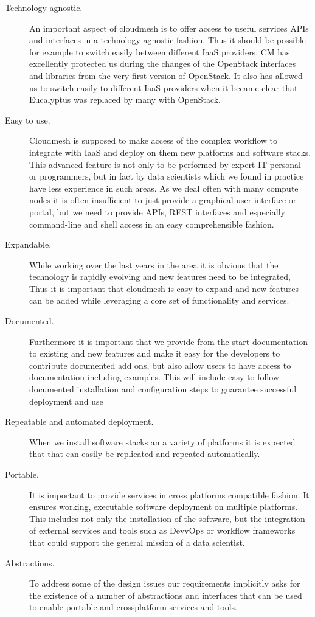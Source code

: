 \begin{description}
\item [Technology agnostic.] An important aspect of cloudmesh is to
  offer access to useful services APIs and interfaces in a technology
  agnostic fashion. Thus it should be possible for example to switch
  easily between different IaaS providers. CM has excellently protected
  us during the changes of the OpenStack interfaces and libraries from
  the very first version of OpenStack. It also has allowed us to
  switch easily to different IaaS providers when it became clear that
  Eucalyptus was replaced by many with OpenStack.

\item[Easy to use.] Cloudmesh is supposed to make access of the
  complex workflow to integrate with IaaS and deploy on them new
  platforms and software stacks. This advanced feature is not only to
  be performed by expert IT personal or programmers, but in fact by
  data scientists which we found in practice have less experience in
  such areas. As we deal often with many compute nodes it is often
  insufficient to just provide a graphical user interface or portal, but
  we need to provide APIs, REST interfaces and especially command-line
  and shell access in an easy comprehensible fashion. 

\item[Expandable.] While working over the last years in the area it is
  obvious that the technology is rapidly evolving and new features
  need to be integrated, Thus it is important that cloudmesh is easy
  to expand and new features can be added while leveraging a core set
  of functionality and services.

\item[Documented.] Furthermore it is important that we provide from
  the start documentation to existing and new features and make it
  easy for the developers to contribute documented add ons, but also
  allow users to have access to documentation including examples. This
  will include easy to follow documented installation and configuration steps 
to guarantee successful deployment and use

\item[Repeatable and automated deployment.] When we install software
  stacks an a variety of platforms it is expected that that can easily
  be replicated and repeated automatically.

\item[Portable.] It is important to provide services in cross
  platforms compatible fashion. It ensures working, executable
  software deployment on multiple platforms. This includes not only
  the installation of the software, but the integration of external
  services and tools such as DevvOps or workflow frameworks that could
  support the general mission of a data scientist.

\item[Abstractions.] To address some of the design issues our
  requirements implicitly asks for the existence of a number of
  abstractions and interfaces that can be used to enable portable and
  crossplatform services and tools.

\end{description}

